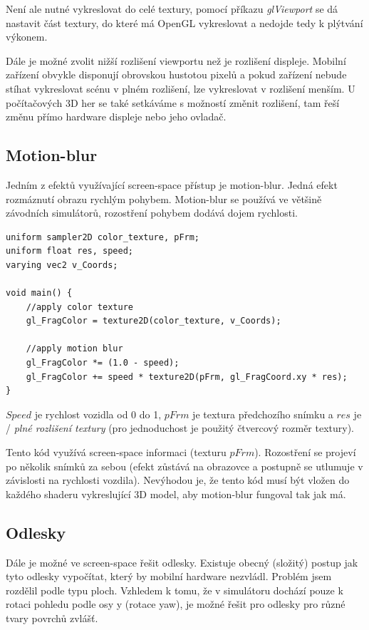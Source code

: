 \documentclass[11pt,twoside,a4paper]{book}
\begin{document}
Není ale nutné vykreslovat do celé textury, pomocí příkazu \textit{glViewport} se dá nastavit část textury, do které má OpenGL vykreslovat a nedojde tedy k plýtvání výkonem.

Dále je možné zvolit nižší rozlišení viewportu než je rozlišení displeje. Mobilní zařízení obvykle disponují obrovskou hustotou pixelů a pokud zařízení nebude stíhat vykreslovat scénu v plném rozlišení, lze vykreslovat v rozlišení menším. U počítačových 3D her se také setkáváme s možností změnit rozlišení, tam řeší změnu přímo hardware displeje nebo jeho ovladač.

\subsection{Motion-blur}
Jedním z efektů využívající screen-space přístup je motion-blur. Jedná efekt rozmáznutí obrazu rychlým pohybem. Motion-blur se používá ve většině závodních simulátorů, rozostření pohybem dodává dojem rychlosti.
\lstset{language=GLSL} 
\begin{lstlisting}[caption=Motion blur fragment shader dle rychlosti vozidla]
uniform sampler2D color_texture, pFrm;
uniform float res, speed;
varying vec2 v_Coords;

void main() {
	//apply color texture
	gl_FragColor = texture2D(color_texture, v_Coords); 

	//apply motion blur
	gl_FragColor *= (1.0 - speed);
	gl_FragColor += speed * texture2D(pFrm, gl_FragCoord.xy * res);
}
\end{lstlisting}

$Speed$ je rychlost vozidla od 0 do 1, $pFrm$ je textura předchozího snímku a $res$ je / \textit{plné rozlišení textury} (pro jednoduchost je použitý čtvercový rozměr textury).

Tento kód využívá screen-space informaci (texturu $pFrm$). Rozostření se projeví po několik snímků za sebou (efekt zůstává na obrazovce a postupně se utlumuje v závislosti na rychlosti vozdila). Nevýhodou je, že tento kód musí být vložen do každého shaderu vykreslující 3D model, aby motion-blur fungoval tak jak má.

\subsection{Odlesky}
Dále je možné ve screen-space řešit odlesky. Existuje obecný (složitý) postup jak tyto odlesky vypočítat, který by mobilní hardware nezvládl. Problém jsem rozdělil podle typu ploch. Vzhledem k tomu, že v simulátoru dochází pouze k rotaci pohledu podle osy y (rotace yaw), je možné řešit pro odlesky pro různé tvary povrchů zvlášť.
\end{document}
